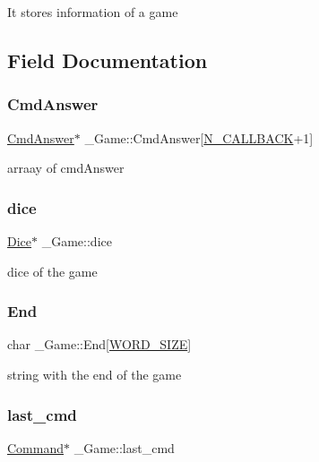 It stores information of a game 

\subsection{Field Documentation}
\mbox{\label{struct__Game_a4a34733add6a619004edb7326a8c300f}} 
\subsubsection{\texorpdfstring{Cmd\+Answer}{CmdAnswer}}
{\footnotesize\ttfamily \hyperlink{cmdAnswer_8h_a2e704274c270f99c8eaf383d11982d03}{Cmd\+Answer}$\ast$ \+\_\+\+Game\+::\+Cmd\+Answer\mbox{[}\hyperlink{game_8c_a8366e5ad74afbbea0cd0a414770c304a}{N\+\_\+\+C\+A\+L\+L\+B\+A\+CK}+1\mbox{]}}

arraay of cmd\+Answer \mbox{\label{struct__Game_af7004361a877182511a3e501b0949220}} 
\subsubsection{\texorpdfstring{dice}{dice}}
{\footnotesize\ttfamily \hyperlink{dice_8h_a5910ae86cf402855269700abd23e3976}{Dice}$\ast$ \+\_\+\+Game\+::dice}

dice of the game \mbox{\label{struct__Game_a712217e97c6ca0b8907fe40e4dc066c7}} 
\subsubsection{\texorpdfstring{End}{End}}
{\footnotesize\ttfamily char \+\_\+\+Game\+::\+End\mbox{[}\hyperlink{types_8h_a92ed8507d1cd2331ad09275c5c4c1c89}{W\+O\+R\+D\+\_\+\+S\+I\+ZE}\mbox{]}}

string with the end of the game \mbox{\label{struct__Game_a47afef4b632256566d81da0f50e7a380}} 
\subsubsection{\texorpdfstring{last\+\_\+cmd}{last\_cmd}}
{\footnotesize\ttfamily \hyperlink{command_8h_a7d2935971c252377cb0fc1c8545dc2bc}{Command}$\ast$ \+\_\+\+Game\+::last\+\_\+cmd}

